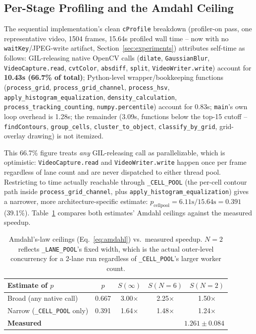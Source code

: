 \documentclass[conference]{IEEEtran}
\newcommand{\code}[1]{\texttt{#1}}
\begin{document}
\subsection{Per-Stage Profiling and the Amdahl Ceiling}
\label{sec:results-amdahl}
The sequential implementation's clean \code{cProfile} breakdown
(profiler-on pass, one representative video, 1504 frames, 15.64s
profiled wall time -- now with no \code{waitKey}/JPEG-write artifact,
Section~\ref{sec:experiments}) attributes self-time as follows:
GIL-releasing native OpenCV calls (\code{dilate}, \code{GaussianBlur},
\code{VideoCapture.read}, \code{cvtColor}, \code{absdiff}, \code{split},
\code{VideoWriter.write}) account for \textbf{10.43s (66.7\% of total)};
Python-level wrapper/bookkeeping functions (\code{process\_grid},
\code{process\_grid\_channel}, \code{process\_hsv},
\code{apply\_histogram\_equalization}, \code{density\_calculation},
\code{process\_tracking\_counting}, \code{numpy.percentile}) account for
0.83s; \code{main}'s own loop overhead is 1.28s; the remainder
(3.09s, functions below the top-15 cutoff -- \code{findContours},
\code{group\_cells}, \code{cluster\_to\_object}, \code{classify\_by\_grid},
grid-overlay drawing) is not itemized.

This 66.7\% figure treats \emph{any} GIL-releasing call as
parallelizable, which is optimistic: \code{VideoCapture.read} and
\code{VideoWriter.write} happen once per frame regardless of lane count
and are never dispatched to either thread pool. Restricting to time
actually reachable through \code{\_CELL\_POOL} (the per-cell contour
path inside \code{process\_grid\_channel}, plus
\code{apply\_histogram\_equalization}) gives a narrower, more
architecture-specific estimate: $p_{\text{cellpool}} = 6.11\text{s} /
15.64\text{s} = 0.391$ (39.1\%). Table~\ref{tab:amdahl} compares both
estimates' Amdahl ceilings against the measured speedup.

\begin{table}[t]
\centering
\caption{Amdahl's-law ceilings (Eq.~\eqref{eq:amdahl}) vs.\ measured
speedup. $N{=}2$ reflects \code{\_LANE\_POOL}'s fixed width, which is
the actual outer-level concurrency for a 2-lane run regardless of
\code{\_CELL\_POOL}'s larger worker count.}
\label{tab:amdahl}
\footnotesize
\begin{tabular}{lcccc}
\toprule
\textbf{Estimate of $p$} & \textbf{$p$} & \textbf{$S(\infty)$} & \textbf{$S(N{=}6)$} & \textbf{$S(N{=}2)$} \\
\midrule
Broad (any native call) & 0.667 & 3.00$\times$ & 2.25$\times$ & 1.50$\times$ \\
Narrow (\code{\_CELL\_POOL} only) & 0.391 & 1.64$\times$ & 1.48$\times$ & 1.24$\times$ \\
\midrule
\multicolumn{2}{l}{\textbf{Measured}} & \multicolumn{3}{r}{$\mathbf{1.261 \pm 0.084}$} \\
\bottomrule
\end{tabular}
\end{table}
\end{document}
